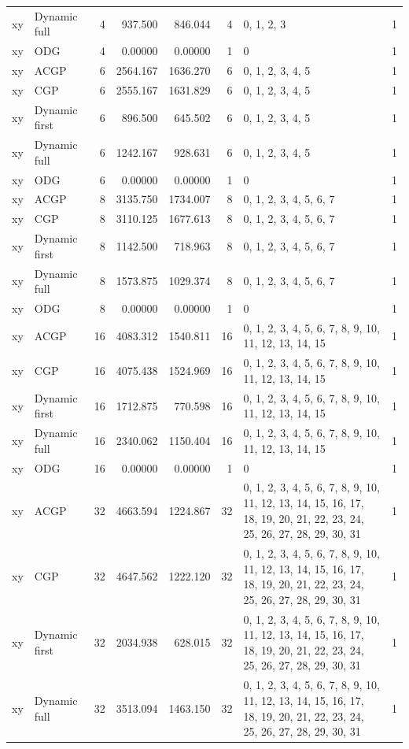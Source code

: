 \documentclass[10pt,a4paper]{article}
\begin{document}
\begin{longtable}{@{}p{23mm}p{29mm}rrrrp{36mm}r@{}}
xy & Dynamic full & 4 & 937.500 & 846.044 & 4 & 0, 1, 2, 3 & 1 \\
xy & ODG & 4 & 0.00000 & 0.00000 & 1 & 0 & 1 \\
xy & ACGP & 6 & 2564.167 & 1636.270 & 6 & 0, 1, 2, 3, 4, 5 & 1 \\
xy & CGP & 6 & 2555.167 & 1631.829 & 6 & 0, 1, 2, 3, 4, 5 & 1 \\
xy & Dynamic first & 6 & 896.500 & 645.502 & 6 & 0, 1, 2, 3, 4, 5 & 1 \\
xy & Dynamic full & 6 & 1242.167 & 928.631 & 6 & 0, 1, 2, 3, 4, 5 & 1 \\
xy & ODG & 6 & 0.00000 & 0.00000 & 1 & 0 & 1 \\
xy & ACGP & 8 & 3135.750 & 1734.007 & 8 & 0, 1, 2, 3, 4, 5, 6, 7 & 1 \\
xy & CGP & 8 & 3110.125 & 1677.613 & 8 & 0, 1, 2, 3, 4, 5, 6, 7 & 1 \\
xy & Dynamic first & 8 & 1142.500 & 718.963 & 8 & 0, 1, 2, 3, 4, 5, 6, 7 & 1 \\
xy & Dynamic full & 8 & 1573.875 & 1029.374 & 8 & 0, 1, 2, 3, 4, 5, 6, 7 & 1 \\
xy & ODG & 8 & 0.00000 & 0.00000 & 1 & 0 & 1 \\
xy & ACGP & 16 & 4083.312 & 1540.811 & 16 & 0, 1, 2, 3, 4, 5, 6, 7, 8, 9, 10, 11, 12, 13, 14, 15 & 1 \\
xy & CGP & 16 & 4075.438 & 1524.969 & 16 & 0, 1, 2, 3, 4, 5, 6, 7, 8, 9, 10, 11, 12, 13, 14, 15 & 1 \\
xy & Dynamic first & 16 & 1712.875 & 770.598 & 16 & 0, 1, 2, 3, 4, 5, 6, 7, 8, 9, 10, 11, 12, 13, 14, 15 & 1 \\
xy & Dynamic full & 16 & 2340.062 & 1150.404 & 16 & 0, 1, 2, 3, 4, 5, 6, 7, 8, 9, 10, 11, 12, 13, 14, 15 & 1 \\
xy & ODG & 16 & 0.00000 & 0.00000 & 1 & 0 & 1 \\
xy & ACGP & 32 & 4663.594 & 1224.867 & 32 & 0, 1, 2, 3, 4, 5, 6, 7, 8, 9, 10, 11, 12, 13, 14, 15, 16, 17, 18, 19, 20, 21, 22, 23, 24, 25, 26, 27, 28, 29, 30, 31 & 1 \\
xy & CGP & 32 & 4647.562 & 1222.120 & 32 & 0, 1, 2, 3, 4, 5, 6, 7, 8, 9, 10, 11, 12, 13, 14, 15, 16, 17, 18, 19, 20, 21, 22, 23, 24, 25, 26, 27, 28, 29, 30, 31 & 1 \\
xy & Dynamic first & 32 & 2034.938 & 628.015 & 32 & 0, 1, 2, 3, 4, 5, 6, 7, 8, 9, 10, 11, 12, 13, 14, 15, 16, 17, 18, 19, 20, 21, 22, 23, 24, 25, 26, 27, 28, 29, 30, 31 & 1 \\
xy & Dynamic full & 32 & 3513.094 & 1463.150 & 32 & 0, 1, 2, 3, 4, 5, 6, 7, 8, 9, 10, 11, 12, 13, 14, 15, 16, 17, 18, 19, 20, 21, 22, 23, 24, 25, 26, 27, 28, 29, 30, 31 & 1 \\

\end{longtable}
\end{document}
